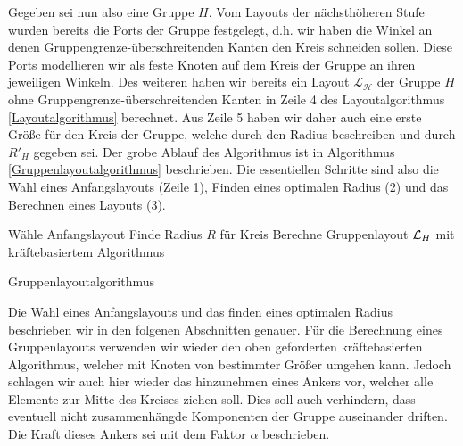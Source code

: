 
Gegeben sei nun also eine Gruppe $H$. Vom Layouts der nächsthöheren Stufe wurden bereits die Ports der Gruppe festgelegt, d.h. wir haben die Winkel an denen Gruppengrenze-überschreitenden Kanten den Kreis schneiden sollen. Diese Ports modellieren wir als feste Knoten auf dem Kreis der Gruppe an ihren jeweiligen Winkeln.
Des weiteren haben wir bereits ein Layout $\mathcal{L_H}$ der Gruppe $H$ ohne Gruppengrenze-überschreitenden Kanten in Zeile 4 des Layoutalgorithmus \ref{Layoutalgorithmus}  berechnet.
Aus Zeile 5 haben wir daher auch eine erste Größe für den Kreis der Gruppe, welche durch den Radius beschreiben und durch $R'_H$ gegeben sei. 
Der grobe Ablauf des Algorithmus ist in Algorithmus \ref{Gruppenlayoutalgorithmus} beschrieben. 
Die essentiellen Schritte sind also die Wahl eines Anfangslayouts (Zeile 1), Finden eines optimalen Radius (2) und das Berechnen eines Layouts (3).

\begin{algorithm}[H]
\label{Gruppenlayoutalgorithmus}
\SetAlgoLined
{} 
Wähle Anfangslayout\;
Finde Radius $R$ für Kreis\;
Berechne Gruppenlayout  $\mathcal{L}_H$ mit kräftebasiertem Algorithmus\;
\caption{Gruppenlayoutalgorithmus}
\end{algorithm}



Die Wahl eines Anfangslayouts und das finden eines optimalen Radius beschrieben wir  in den folgenen Abschnitten  genauer. 
Für die Berechnung eines Gruppenlayouts verwenden wir wieder den oben geforderten kräftebasierten Algorithmus, welcher mit Knoten von bestimmter Größer umgehen kann. 
Jedoch schlagen wir auch hier wieder das hinzunehmen eines Ankers vor, welcher alle Elemente zur Mitte des Kreises ziehen soll.
 Dies soll auch verhindern, dass eventuell nicht zusammenhängde Komponenten der Gruppe auseinander driften. Die Kraft dieses Ankers sei mit dem Faktor $\alpha$ beschrieben. 

